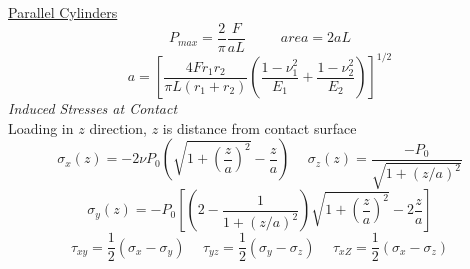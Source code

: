 \documentclass[twocolumn, 12pt]{article}    %
\begin{document}
\underline{Parallel Cylinders}\\
\begin{equation*}
    P_{max} = \frac{2}{\pi} \frac{F}{aL} \hspace{30pt} area = 2aL
\end{equation*}
\begin{equation*}
    a = \left[\frac{4Fr_1r_2}{\pi L (r_1+r_2)} \left( \frac{1-\nu_1^2}{E_1} + \frac{1-\nu_2^2}{E_2} \right)  \right]^{1/2}
\end{equation*}
\textit{Induced Stresses at Contact}\\
Loading in \(z\) direction, \(z\) is distance from contact surface
\begin{equation*}
    \sigma_x(z) = -2\nu P_0 \left( \sqrt{1 + \left( \frac{z}{a}\right)^2 }  - \frac{z}{a} \right) \hspace{15pt} \sigma_z(z) = \frac{-P_0}{\sqrt{1 + (z/a)^2}}
\end{equation*}
\begin{equation*}
    \sigma_y(z) = -P_0 \left[ \left( 2 - \frac{1}{1+(z/a)^2} \right) \sqrt{ 1 + \left( \frac{z}{a} \right)^2} -2\frac{z}{a} \right]
\end{equation*}
\begin{equation*}
    \tau_{xy} = \frac{1}{2} (\sigma_x-\sigma_y) \hspace{15pt} \tau_{yz} = \frac{1}{2} (\sigma_y-\sigma_z) \hspace{15pt} \tau_{xZ} = \frac{1}{2} (\sigma_x-\sigma_z) 
\end{equation*}
\end{document}
